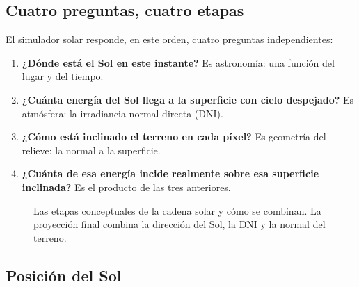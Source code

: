 \documentclass[11pt,a4paper]{article}
\begin{document}
\subsection{Cuatro preguntas, cuatro etapas}

El simulador solar responde, en este orden, cuatro preguntas independientes:
\begin{enumerate}
  \item \textbf{¿Dónde está el Sol en este instante?} Es astronomía: una función del lugar y del tiempo.
  \item \textbf{¿Cuánta energía del Sol llega a la superficie con cielo despejado?} Es atmósfera: la irradiancia
        normal directa (DNI).
  \item \textbf{¿Cómo está inclinado el terreno en cada píxel?} Es geometría del relieve: la normal a la
        superficie.
  \item \textbf{¿Cuánta de esa energía incide realmente sobre esa superficie inclinada?} Es el producto de las
        tres anteriores.
\end{enumerate}

\begin{figure}[htbp]
\centering
{}
\caption{Las etapas conceptuales de la cadena solar y cómo se combinan. La proyección final combina la
dirección del Sol, la DNI y la normal del terreno.}
\label{fig:cadena-solar}
\end{figure}

\subsection{Posición del Sol}
\end{document}
